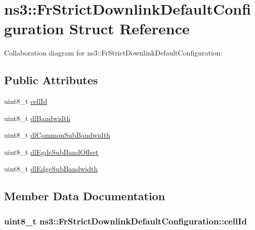 \hypertarget{structns3_1_1FrStrictDownlinkDefaultConfiguration}{}\section{ns3\+:\+:Fr\+Strict\+Downlink\+Default\+Configuration Struct Reference}
\label{structns3_1_1FrStrictDownlinkDefaultConfiguration}


Collaboration diagram for ns3\+:\+:Fr\+Strict\+Downlink\+Default\+Configuration\+:
\subsection*{Public Attributes}
\begin{DoxyCompactItemize}
\item 
uint8\+\_\+t \hyperlink{structns3_1_1FrStrictDownlinkDefaultConfiguration_a0d8408b3f697b1df3d2356d1bb0ec267}{cell\+Id}
\item 
uint8\+\_\+t \hyperlink{structns3_1_1FrStrictDownlinkDefaultConfiguration_a11300e7c2696ecce03fe01176d544597}{dl\+Bandwidth}
\item 
uint8\+\_\+t \hyperlink{structns3_1_1FrStrictDownlinkDefaultConfiguration_a102a545305b13223e9147fad2b71bda2}{dl\+Common\+Sub\+Bandwidth}
\item 
uint8\+\_\+t \hyperlink{structns3_1_1FrStrictDownlinkDefaultConfiguration_ab66b35fa9eb29f7b82a63b48616a804a}{dl\+Egde\+Sub\+Band\+Offset}
\item 
uint8\+\_\+t \hyperlink{structns3_1_1FrStrictDownlinkDefaultConfiguration_ab80af7cbb74292f0cfcdacaa622f0123}{dl\+Edge\+Sub\+Bandwidth}
\end{DoxyCompactItemize}


\subsection{Member Data Documentation}
\subsubsection[{\texorpdfstring{cell\+Id}{cellId}}]{\setlength{\rightskip}{0pt plus 5cm}uint8\+\_\+t ns3\+::\+Fr\+Strict\+Downlink\+Default\+Configuration\+::cell\+Id}\hypertarget{structns3_1_1FrStrictDownlinkDefaultConfiguration_a0d8408b3f697b1df3d2356d1bb0ec267}{}\label{structns3_1_1FrStrictDownlinkDefaultConfiguration_a0d8408b3f697b1df3d2356d1bb0ec267}
